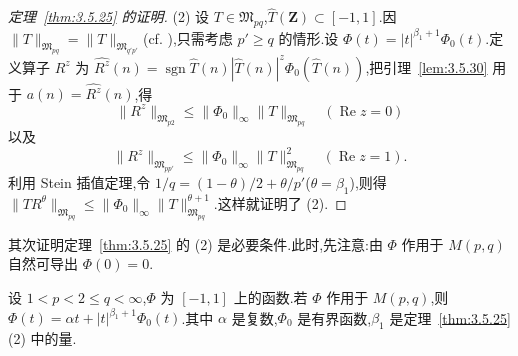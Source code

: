 \begin{proof}[定理~\ref{thm:3.5.25} 的证明]
(2) 设 $T \in \mathfrak{M}_{pq}$,$\widehat{T}(\mathbf{Z}) \subset [-1, 1]$.因 $\|T\|_{\mathfrak{M}_{pq}} = \|T\|_{\mathfrak{M}_{q'p'}}$(cf. \cite{ch3:9}),只需考虑 $p' \geq q$ 的情形.设 $\Phi(t) = |t|^{\beta_1 + 1}\Phi_0(t)$.定义算子 $R^z$ 为 $\widehat{R^z}(n) = \operatorname{sgn}\widehat{T}(n)|\widehat{T}(n)|^z\Phi_0(\widehat{T}(n))$,把引理~\ref{lem:3.5.30} 用于 $a(n) = \widehat{R^z}(n)$,得
\begin{equation*}
\|R^{z}\|_{\mathfrak{M}_{p2}} \leq \|\Phi_{0}\|_{\infty}\|T\|_{\mathfrak{M}_{pq}} \quad (\operatorname{Re}z = 0)
\end{equation*}
以及
\begin{equation*}
\|R^{z}\|_{\mathfrak{M}_{pp'}} \leq \|\Phi_{0}\|_{\infty}\|T\|_{\mathfrak{M}_{pq}}^{2} \quad (\operatorname{Re}z = 1).
\end{equation*}
利用 Stein 插值定理,令 $1/q = (1 - \theta)/2 + \theta/p'$($\theta = \beta_1$),则得 $\|TR^{\theta}\|_{\mathfrak{M}_{pq}} \leq \|\Phi_0\|_\infty\|T\|_{\mathfrak{M}_{pq}}^{\theta+1}$.这样就证明了 (2).
\end{proof}

其次证明定理~\ref{thm:3.5.25} 的 (2) 是必要条件.此时,先注意:由 $\Phi$ 作用于 $M(p,q)$ 自然可导出 $\Phi(0)=0$.

\begin{theorem}\label{thm:3.5.31}
设 $1 < p < 2 \leq q < \infty$,$\Phi$ 为 $[-1, 1]$ 上的函数.若 $\Phi$ 作用于 $M(p,q)$,则 $\Phi(t) = \alpha t + |t|^{\beta_{1}+1}\Phi_{0}(t)$.其中 $\alpha$ 是复数,$\Phi_{0}$ 是有界函数,$\beta_{1}$ 是定理~\ref{thm:3.5.25} (2) 中的量.
\end{theorem}

